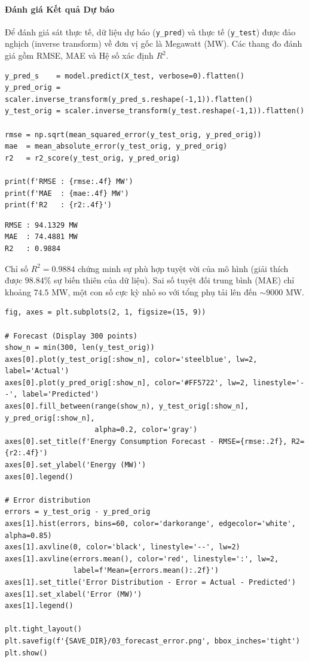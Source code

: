 \paragraph{Đánh giá Kết quả Dự báo} \hfill\mbox{}

Để đánh giá sát thực tế, dữ liệu dự báo (\texttt{y\_pred}) và thực tế (\texttt{y\_test}) được đảo nghịch (inverse transform) về đơn vị gốc là Megawatt (MW). Các thang đo đánh giá gồm RMSE, MAE và Hệ số xác định $R^2$.

\begin{lstlisting}[style=pythoncode, caption={Dự báo và tính toán các thang đo sai số hồi quy}]
y_pred_s    = model.predict(X_test, verbose=0).flatten()
y_pred_orig = scaler.inverse_transform(y_pred_s.reshape(-1,1)).flatten()
y_test_orig = scaler.inverse_transform(y_test.reshape(-1,1)).flatten()

rmse = np.sqrt(mean_squared_error(y_test_orig, y_pred_orig))
mae  = mean_absolute_error(y_test_orig, y_pred_orig)
r2   = r2_score(y_test_orig, y_pred_orig)

print(f'RMSE : {rmse:.4f} MW')
print(f'MAE  : {mae:.4f} MW')
print(f'R2   : {r2:.4f}')
\end{lstlisting}

\begin{lstlisting}[style=consoleoutput, caption={Output: Các chỉ số hồi quy (Regression Metrics)}]
RMSE : 94.1329 MW
MAE  : 74.4881 MW
R2   : 0.9884
\end{lstlisting}

Chỉ số $R^2 = 0.9884$ chứng minh sự phù hợp tuyệt vời của mô hình (giải thích được $98.84\%$ sự biến thiên của dữ liệu). Sai số tuyệt đối trung bình (MAE) chỉ khoảng $74.5$ MW, một con số cực kỳ nhỏ so với tổng phụ tải lên đến $\sim 9000$ MW.

\begin{lstlisting}[style=pythoncode, caption={Trực quan hóa đường dự báo và phân phối sai số}]
fig, axes = plt.subplots(2, 1, figsize=(15, 9))

# Forecast (Display 300 points)
show_n = min(300, len(y_test_orig))
axes[0].plot(y_test_orig[:show_n], color='steelblue', lw=2, label='Actual')
axes[0].plot(y_pred_orig[:show_n], color='#FF5722', lw=2, linestyle='--', label='Predicted')
axes[0].fill_between(range(show_n), y_test_orig[:show_n], y_pred_orig[:show_n],
                     alpha=0.2, color='gray')
axes[0].set_title(f'Energy Consumption Forecast - RMSE={rmse:.2f}, R2={r2:.4f}')
axes[0].set_ylabel('Energy (MW)')
axes[0].legend()

# Error distribution
errors = y_test_orig - y_pred_orig
axes[1].hist(errors, bins=60, color='darkorange', edgecolor='white', alpha=0.85)
axes[1].axvline(0, color='black', linestyle='--', lw=2)
axes[1].axvline(errors.mean(), color='red', linestyle=':', lw=2,
                label=f'Mean={errors.mean():.2f}')
axes[1].set_title('Error Distribution - Error = Actual - Predicted')
axes[1].set_xlabel('Error (MW)')
axes[1].legend()

plt.tight_layout()
plt.savefig(f'{SAVE_DIR}/03_forecast_error.png', bbox_inches='tight')
plt.show()
\end{lstlisting}

